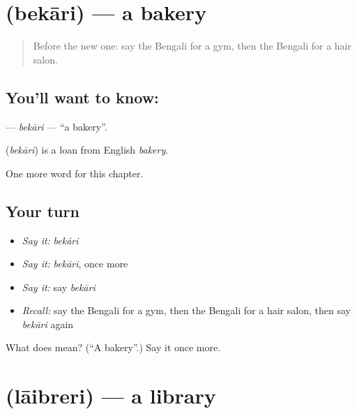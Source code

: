 \section[\texorpdfstring{\bn{বেকারি} (bekāri)}{বেকারি (bekāri)}]{ (bekāri) — a bakery}

\label{lesson:BN-C245-bekari}



\begin{quote}
Before the new one: say the Bengali for a gym, then the Bengali for a hair salon.
\end{quote}

\subsection*{You'll want to know: }
\textbf{} — \emph{bekāri} — \textquotedblleft{}a bakery\textquotedblright{}.

\begin{cousinweb}
\textbf{} (\emph{bekāri}) is a loan from English \emph{bakery}.
\end{cousinweb}

\begin{grammarlens}[title={What you've built}]
One more word for this chapter.
\end{grammarlens}

\subsection*{Your turn}
\begin{itemize}
\raggedright
  \item \emph{Say it:} \emph{bekāri}
  \item \emph{Say it:} \emph{bekāri}, once more
  \item \emph{Say it:} say \emph{bekāri}
  \item \emph{Recall:} say the Bengali for a gym, then the Bengali for a hair salon, then say \emph{bekāri} again
\end{itemize}

\begin{tcolorbox}[breakable,colback=teal!4,colframe=teal!35!black,title={Before you move on}]
What does  mean? (\textquotedblleft{}A bakery\textquotedblright{}.) Say it once more.
\end{tcolorbox}
\section[\texorpdfstring{\bn{লাইব্রেরি} (lāibreri)}{লাইব্রেরি (lāibreri)}]{ (lāibreri) — a library}

